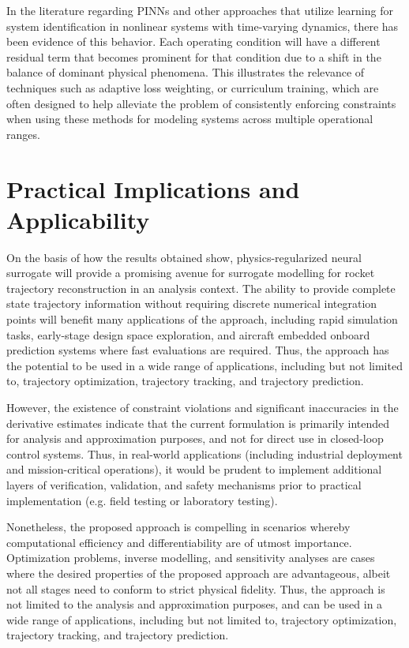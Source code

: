 In the literature regarding PINNs and other approaches that utilize learning for system identification in nonlinear systems 
with time-varying dynamics, there has been evidence of this behavior. Each operating condition will have a different residual 
term that becomes prominent for that condition due to a shift in the balance of dominant physical phenomena. This illustrates 
the relevance of techniques such as adaptive loss weighting, or curriculum training, which are often designed to help 
alleviate the problem of consistently enforcing constraints when using these methods for modeling systems across multiple 
operational ranges.

\section{Practical Implications and Applicability}

On the basis of how the results obtained show, physics-regularized neural surrogate will provide a promising avenue 
for surrogate modelling for rocket trajectory reconstruction in an analysis context. The ability to provide complete 
state trajectory information without requiring discrete numerical integration points will benefit many applications 
of the approach, including rapid simulation tasks, early-stage design space exploration, and aircraft embedded onboard 
prediction systems where fast evaluations are required. Thus, the approach has the potential to be used in a wide range 
of applications, including but not limited to, trajectory optimization, trajectory tracking, and trajectory prediction.

However, the existence of constraint violations and significant inaccuracies in the derivative estimates indicate that 
the current formulation is primarily intended for analysis and approximation purposes, and not for direct use in closed-loop 
control systems. Thus, in real-world applications (including industrial deployment and mission-critical operations), it would 
be prudent to implement additional layers of verification, validation, and safety mechanisms prior to practical implementation 
(e.g. field testing or laboratory testing).

Nonetheless, the proposed approach is compelling in scenarios whereby computational efficiency and differentiability are 
of utmost importance. Optimization problems, inverse modelling, and sensitivity analyses are cases where the desired 
properties of the proposed approach are advantageous, albeit not all stages need to conform to strict physical fidelity. 
Thus, the approach is not limited to the analysis and approximation purposes, and can be used in a wide range of 
applications, including but not limited to, trajectory optimization, trajectory tracking, and trajectory prediction.

